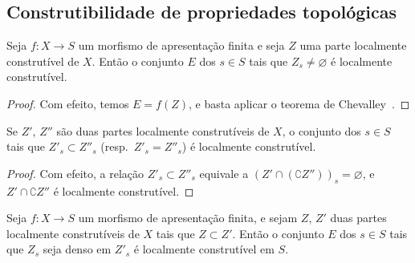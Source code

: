 \subsection{Construtibilidade de propriedades topológicas}
\label{subsection:IV.9.5}

\begin{proposition}[9.5.1]
\label{IV.9.5.1}
Seja $f:X\to S$ um morfismo de apresentação finita e seja $Z$ uma parte localmente construtível de $X$.
Então o conjunto $E$ dos $s\in S$ tais que $Z_s\neq\varnothing$ é localmente construtível.
\end{proposition}

\begin{proof}
Com efeito, temos $E=f(Z)$, e basta aplicar o teorema de Chevalley~.
\end{proof}

\begin{corollary}[9.5.2]
\label{IV.9.5.2}
Se $Z'$, $Z''$ são duas partes localmente construtíveis de $X$, o conjunto dos $s\in S$ tais que $Z'_s\subset Z''_s$ \textnormal{(}resp.\ $Z'_s=Z''_s$\textnormal{)} é localmente construtível.
\end{corollary}

\begin{proof}
Com efeito, a relação $Z'_s\subset Z''_s$ equivale a $(Z'\cap(\complement Z''))_s=\varnothing$, e $Z'\cap\complement Z''$ é localmente construtível.
\end{proof}

\begin{proposition}[9.5.3]
\label{IV.9.5.3}
Seja $f:X\to S$ um morfismo de apresentação finita, e sejam $Z$, $Z'$ duas partes localmente construtíveis de $X$ tais que $Z\subset Z'$.
Então o conjunto $E$ dos $s\in S$ tais que $Z_s$ seja denso em $Z'_s$ é localmente construtível em $S$.
\end{proposition}

